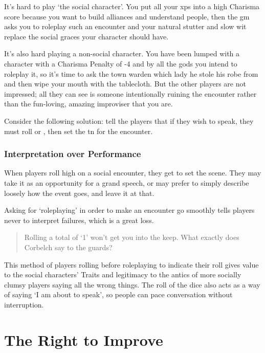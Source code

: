 \begin{multicols}{2}

\noindent
It's hard to play `the social character'.
You put all your \glspl{xp} into a high Charisma score because you want to build alliances and understand people, then the \gls{gm} asks you to roleplay such an encounter and your natural stutter and slow wit replace the social graces your character should have.

It's also hard playing a non-social character.
You have been lumped with a character with a Charisma Penalty of -4 and by all the gods you intend to roleplay it, so it's time to ask the town warden which lady he stole his robe from and then wipe your mouth with the tablecloth.
But the other players are not impressed; all they can see is someone intentionally ruining the encounter rather than the fun-loving, amazing improviser that you are.

Consider the following solution: tell the players that if they wish to speak, they must roll  or , then set the \gls{tn} for the encounter.

\subsubsection{Interpretation over Performance}

When players roll high on a social encounter, they get to set the scene.
They may take it as an opportunity for a grand speech, or may prefer to simply describe loosely how the event goes, and leave it at that.

Asking for `roleplaying' in order to make an encounter go smoothly tells players never to interpret failures, which is a great loss.

\begin{quotation}
  Rolling a total of `1' won't get you into the keep.
  What exactly does Corbelch say to the guards?
\end{quotation}

This method of players rolling before roleplaying to indicate their roll gives value to the social characters' Traits and legitimacy to the antics of more socially clumsy players saying all the wrong things.
The roll of the dice also acts as a way of saying `I am about to speak', so people can pace conversation without interruption.

\end{multicols}

\section*{The Right to Improve}

